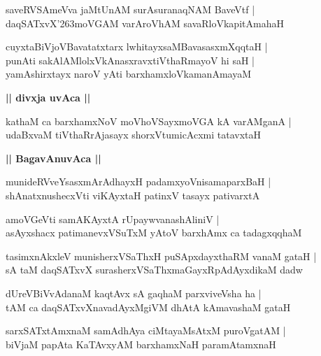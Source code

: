 \documentclass[twoside,12pt,openright]{book}
\def\S{\char'263}
\newcounter{shloka}[chapter]
\def\uvaca#1{\centerline{{\large\textbf{#1}}}}
\begin{document}
\begin{shloka}%
saveRVSAmeVva jaMtUnAM surAsuranaqNAM BaveVtf |\\
daqSATxvX\S moVGAM varAroVhAM savaRloVkapitAmahaH 
\end{shloka}

\begin{shloka}%
cuyxtaBiVjoVBavatatxtarx lwhitayxsaMBavasasxmXqqtaH |\\
punAti sakAlAMlolxVkAnasxravxtiVthaRmayoV hi saH |\\
yamAshirxtayx naroV yAti barxhamxloVkamanAmayaM 
\end{shloka}

\uvaca{|| divxja uvAca ||}

\begin{shloka}%
kathaM ca barxhamxNoV moVhoVSayxmoVGA kA varAMganA |\\
udaBxvaM tiVthaRrAjasayx shorxVtumicAcxmi tatavxtaH 
\end{shloka}

\uvaca{|| BagavAnuvAca ||}

\begin{shloka}%
munideRVveYsasxmArAdhayxH padamxyoVnisamaparxBaH |\\
shAnatxnushecxVti viKAyxtaH patinxV tasayx pativarxtA
\end{shloka}

\begin{shloka}%
amoVGeVti samAKAyxtA rUpaywvanashAliniV |\\
asAyxshacx patimanevxVSuTxM yAtoV barxhAmx ca tadagxqqhaM 
\end{shloka}

\begin{shloka}%
tasimxnAkxleV munisherxVSaThxH puSApxdayxthaRM vanaM gataH |\\
sA taM daqSATxvX surasherxVSaThxmaGayxRpAdAyxdikaM dadw
\end{shloka}

\begin{shloka}%
dUreVBiVvAdanaM kaqtAvx sA gaqhaM parxviveVsha ha |\\
tAM ca daqSATxvXnavadAyxMgiVM dhAtA kAmavashaM gataH 
\end{shloka}

\begin{shloka}%
sarxSATxtAmxnaM samAdhAya ciMtayaMsAtxM puroVgatAM |\\
biVjaM papAta KaTAvxyAM barxhamxNaH paramAtamxnaH 
\end{shloka}
\end{document}
